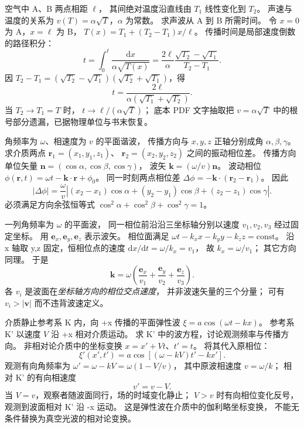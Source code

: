空气中 A、B 两点相距 $\ell$，
其间绝对温度沿直线由 $T_1$ 线性变化到 $T_2$。
声速与温度的关系为
$v(T)=\alpha\sqrt T$，$\alpha$ 为常数。
求声波从 A 到 B 所需时间。
\exsolution
令 $x=0$ 为 A，$x=\ell$ 为 B，
$T(x)=T_1+(T_2-T_1)x/\ell$。
传播时间是局部速度倒数的路径积分：
\[
t=\int_0^\ell\frac{\mathrm dx}{\alpha\sqrt{T(x)}}
=\frac{2\ell}{\alpha}
\frac{\sqrt{T_2}-\sqrt{T_1}}{T_2-T_1}.
\]
因
$T_2-T_1=(\sqrt{T_2}-\sqrt{T_1})
(\sqrt{T_2}+\sqrt{T_1})$，得
\[
\boxed{t=\frac{2\ell}
{\alpha(\sqrt{T_1}+\sqrt{T_2})}}.
\]
\excheck 当 $T_2\to T_1=T$ 时，
$t\to\ell/(\alpha\sqrt T)$；
底本 PDF 文字抽取把 $v=\alpha\sqrt T$
中的根号部分遗漏，已据物理单位与书末恢复。

角频率为 $\omega$、相速度为 $v$ 的平面谐波，
传播方向与 $x,y,z$ 正轴分别成角
$\alpha,\beta,\gamma$。
求介质两点
$\bm r_1=(x_1,y_1,z_1)$、
$\bm r_2=(x_2,y_2,z_2)$ 之间的振动相位差。
\exsolution
传播方向单位矢量
$\bm n=(\cos\alpha,\cos\beta,\cos\gamma)$，
波矢 $\bm k=(\omega/v)\bm n$。
波动相位
$\phi(\bm r,t)=\omega t-\bm k\cdot\bm r+\phi_0$。
同一时刻两点相位差
$\Delta\phi=-\bm k\cdot(\bm r_2-\bm r_1)$。
因此
\[
\boxed{|\Delta\phi|=\frac{\omega}{v}
\left|
(x_2-x_1)\cos\alpha+
(y_2-y_1)\cos\beta+
(z_2-z_1)\cos\gamma
\right|}.
\]
\excheck 必须满足方向余弦恒等式
$\cos^2\alpha+\cos^2\beta+\cos^2\gamma=1$。

一列角频率为 $\omega$ 的平面波，
同一相位前沿沿三坐标轴分别以速度
$v_1,v_2,v_3$ 经过固定坐标。
用 $\bm e_x,\bm e_y,\bm e_z$ 表示波矢。
\exsolution
相位面满足
$\omega t-k_xx-k_yy-k_zz=\text{const}$。
沿 x 轴取 y,z 固定，恒相位点的速度
$\mathrm dx/\mathrm dt=\omega/k_x=v_1$，
故 $k_x=\omega/v_1$；
其它方向同理。
于是
\[
\boxed{\bm k=\omega\left(
\frac{\bm e_x}{v_1}+
\frac{\bm e_y}{v_2}+
\frac{\bm e_z}{v_3}\right)}.
\]
\excheck 各 $v_i$ 是波面在\emph{坐标轴方向的相位交点速度}，
并非波速矢量的三个分量；
可有 $v_i>|\bm v|$ 而不违背波速定义。

介质静止参考系 K 内，向 +x 传播的平面弹性波
$\xi=a\cos(\omega t-kx)$。
参考系 K' 以速度 $V$ 沿 +x 相对介质运动。
求 K' 中的波方程，讨论观测频率与传播方向。
\exsolution
非相对论介质中的坐标变换
$x=x'+Vt$、$t'=t$。
将其代入原相位：
\[
\boxed{\xi'(x',t')=
a\cos[(\omega-kV)t'-kx']}.
\]
观测有向角频率为
$\omega'=\omega-kV=\omega(1-V/v)$，
其中原波相速度 $v=\omega/k$；
相对 K' 的有向相速度
\[
\boxed{v'=v-V}.
\]
当 $V=v$，观察者随波面同行，场的时域变化静止；
$V>v$ 时有向相位变化反号，
观测到波面相对 K' 沿 -x 运动。
\excheck 这是弹性波在介质中的伽利略坐标变换，
不能无条件替换为真空光波的相对论变换。

